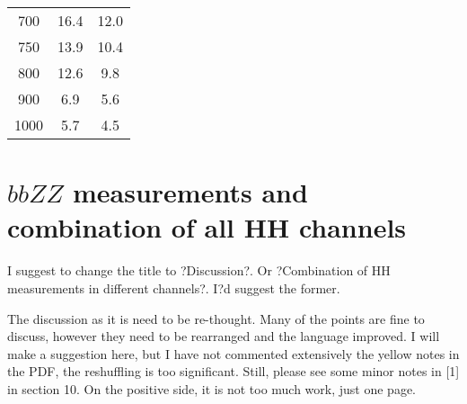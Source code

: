 \begin{table}
\begin{center}
\begin{tabular}{|c|c|c|}
     700 &                16.4 &                12.0 \\
     750 &                13.9 &                10.4 \\
     800 &                12.6 &                 9.8 \\
     900 &                 6.9 &                 5.6 \\
    1000 &                 5.7 &                 4.5 \\
\hline
\end{tabular}
\end{center}
\end{table}


\section{$bbZZ$ measurements and combination of all HH channels}
\label{sec:bbZZcombination}

  I suggest to change the title to  ?Discussion?. Or ?Combination of HH measurements in different channels?.
I?d suggest the former.

   The discussion as it is need to be re-thought. Many of the points are fine to discuss,
however they need to be rearranged and the language improved. I will make a suggestion
here, but I have not commented extensively the yellow notes in the PDF, the reshuffling is  too significant.
Still, please see some minor notes in [1] in section 10.
  On the positive side, it is not too much work,  just one page.

